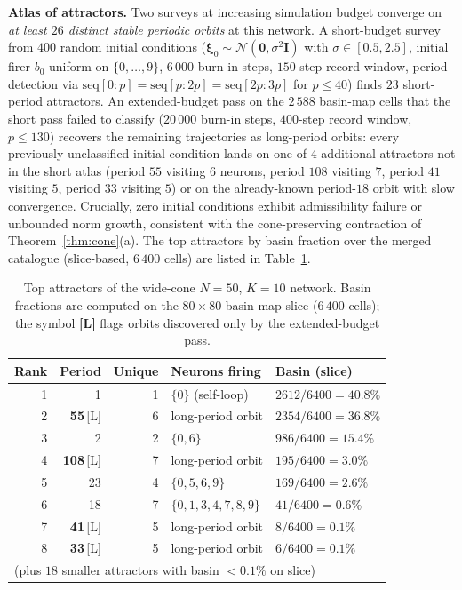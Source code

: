 \documentclass[12pt]{article}
\newcommand{\vv}[1]{\mathbf{#1}}
\begin{document}
\textbf{Atlas of attractors.} Two surveys at increasing simulation budget converge on \emph{at least $26$ distinct stable periodic orbits} at this network. A short-budget survey from $400$ random initial conditions ($\vv{\xi}_0 \sim \mathcal{N}(\vv{0}, \sigma^2 \vv{I})$ with $\sigma\in[0.5,2.5]$, initial firer $b_0$ uniform on $\{0,\ldots,9\}$, $6\,000$ burn-in steps, $150$-step record window, period detection via $\mathrm{seq}[0{:}p]=\mathrm{seq}[p{:}2p]=\mathrm{seq}[2p{:}3p]$ for $p\leq 40$) finds $23$ short-period attractors. An extended-budget pass on the $2\,588$ basin-map cells that the short pass failed to classify ($20\,000$ burn-in steps, $400$-step record window, $p\leq 130$) recovers the remaining trajectories as long-period orbits: every previously-unclassified initial condition lands on one of $4$ additional attractors not in the short atlas (period $55$ visiting $6$ neurons, period $108$ visiting $7$, period $41$ visiting $5$, period $33$ visiting $5$) or on the already-known period-$18$ orbit with slow convergence. Crucially, zero initial conditions exhibit admissibility failure or unbounded norm growth, consistent with the cone-preserving contraction of Theorem~\ref{thm:cone}(a). The top attractors by basin fraction over the merged catalogue (slice-based, $6\,400$ cells) are listed in Table~\ref{tab:wide-cone-atlas}.

\begin{table}[ht]
\centering
\caption{Top attractors of the wide-cone $N{=}50$, $K{=}10$ network. Basin fractions are computed on the $80\times 80$ basin-map slice ($6\,400$ cells); the symbol \textbf{[L]} flags orbits discovered only by the extended-budget pass.}
\label{tab:wide-cone-atlas}
\small
\begin{tabular}{rrrll}
\toprule
Rank & Period & Unique & Neurons firing & Basin (slice) \\
\midrule
1 & 1 & 1 & $\{0\}$ (self-loop) & $2612/6400 = 40.8\%$ \\
2 & \textbf{55}\,[L] & 6 & long-period orbit & $2354/6400 = 36.8\%$ \\
3 & 2 & 2 & $\{0,6\}$ & $986/6400 = 15.4\%$ \\
4 & \textbf{108}\,[L] & 7 & long-period orbit & $195/6400 = 3.0\%$ \\
5 & 23 & 4 & $\{0,5,6,9\}$ & $169/6400 = 2.6\%$ \\
6 & 18 & 7 & $\{0,1,3,4,7,8,9\}$ & $41/6400 = 0.6\%$ \\
7 & \textbf{41}\,[L] & 5 & long-period orbit & $8/6400 = 0.1\%$ \\
8 & \textbf{33}\,[L] & 5 & long-period orbit & $6/6400 = 0.1\%$ \\
\multicolumn{5}{l}{\quad (plus $18$ smaller attractors with basin $<0.1\%$ on slice)} \\
\bottomrule
\end{tabular}
\end{table}
\end{document}
